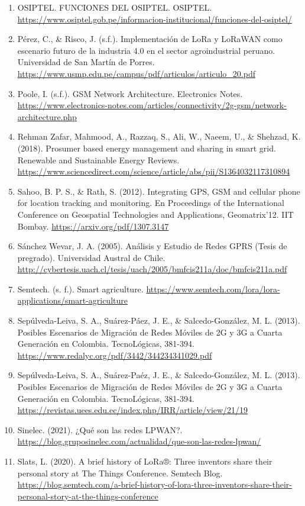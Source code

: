 \documentclass[12pt,a4paper]{article}
\begin{document}
\begin{enumerate}
    \item OSIPTEL. FUNCIONES DEL OSIPTEL. OSIPTEL. \url{https://www.osiptel.gob.pe/informacion-institucional/funciones-del-osiptel/}
    \item Pérez, C., \& Risco, J. (s.f.). Implementación de LoRa y LoRaWAN como escenario futuro de la industria 4.0 en el sector agroindustrial peruano. Universidad de San Martín de Porres. \url{https://www.usmp.edu.pe/campus/pdf/articulos/articulo_20.pdf}
    \item Poole, I. (s.f.). GSM Network Architecture. Electronics Notes. \url{https://www.electronics-notes.com/articles/connectivity/2g-gsm/network-architecture.php}
    \item Rehman Zafar, Mahmood, A., Razzaq, S., Ali, W., Naeem, U., \& Shehzad, K. (2018). Prosumer based energy management and sharing in smart grid. Renewable and Sustainable Energy Reviews. \url{https://www.sciencedirect.com/science/article/abs/pii/S1364032117310894}
    \item Sahoo, B. P. S., \& Rath, S. (2012). Integrating GPS, GSM and cellular phone for location tracking and monitoring. En Proceedings of the International Conference on Geospatial Technologies and Applications, Geomatrix'12. IIT Bombay. \url{https://arxiv.org/pdf/1307.3147}
    \item Sánchez Wevar, J. A. (2005). Análisis y Estudio de Redes GPRS (Tesis de pregrado). Universidad Austral de Chile. \url{http://cybertesis.uach.cl/tesis/uach/2005/bmfcis211a/doc/bmfcis211a.pdf}
    \item Semtech. (s. f.). Smart agriculture. \url{https://www.semtech.com/lora/lora-applications/smart-agriculture}
    \item Sepúlveda-Leiva, S. A., Suárez-Páez, J. E., \& Salcedo-González, M. L. (2013). Posibles Escenarios de Migración de Redes Móviles de 2G y 3G a Cuarta Generación en Colombia. TecnoLógicas, 381-394. \url{https://www.redalyc.org/pdf/3442/344234341029.pdf}
    \item Sepúlveda-Leiva, S. A., Suárez-Paéz, J. E., \& Salcedo-González, M. L. (2013). Posibles Escenarios de Migración de Redes Móviles de 2G y 3G a Cuarta Generación en Colombia. TecnoLógicas, 381-394. \url{https://revistas.uees.edu.ec/index.php/IRR/article/view/21/19}
    \item Sinelec. (2021). ¿Qué son las redes LPWAN?. \url{https://blog.gruposinelec.com/actualidad/que-son-las-redes-lpwan/}
    \item Slats, L. (2020). A brief history of LoRa®: Three inventors share their personal story at The Things Conference. Semtech Blog. \url{https://blog.semtech.com/a-brief-history-of-lora-three-inventors-share-their-personal-story-at-the-things-conference}

\end{enumerate}
\end{document}
